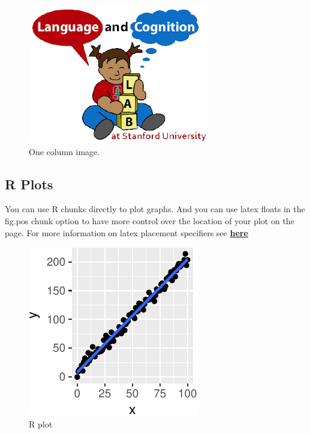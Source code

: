 \documentclass[10pt, letterpaper]{article}
\newenvironment{CodeChunk}{}{}
\begin{document}
\begin{CodeChunk}
\captionsetup{width=0.8\columnwidth}\begin{figure}[H]

{\centering \includegraphics{figs/image-1} 

}

\caption[One column image]{One column image.}\label{fig:image}
\end{figure}
\end{CodeChunk}

\subsection{R Plots}\label{r-plots}

You can use R chunks directly to plot graphs. And you can use latex
floats in the fig.pos chunk option to have more control over the
location of your plot on the page. For more information on latex
placement specifiers see
\textbf{\href{https://en.wikibooks.org/wiki/LaTeX/Floats,_Figures_and_Captions}{here}}

\begin{CodeChunk}
\begin{figure}[H]

{\centering \includegraphics{figs/plot-1} 

}

\caption[R plot]{R plot}\label{fig:plot}
\end{figure}
\end{CodeChunk}
\end{document}
